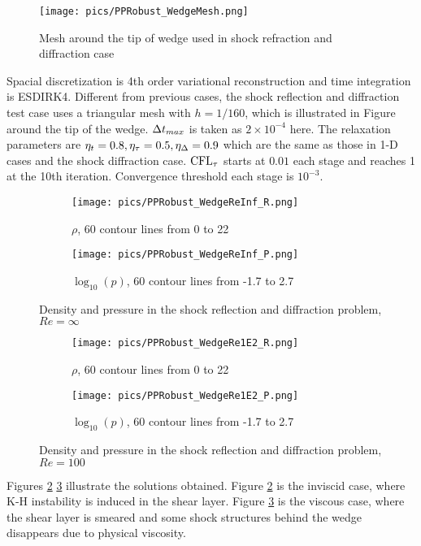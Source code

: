 \begin{figure}[htbp]
    \centering
    \texttt{[image: pics/PPRobust\_WedgeMesh.png]}
    \caption{Mesh around the tip of wedge used in shock refraction and diffraction case}
    \label{fig:wedgeMesh}
\end{figure}

Spacial discretization is 4th order variational reconstruction and 
time integration is ESDIRK4. 
Different from previous cases,
the shock reflection and diffraction test case uses a triangular mesh with $h = 1/160$,
which is illustrated in Figure around the tip of the wedge.
$\mathrm\Delta t_{max}$ is taken as $2\times10^{-4}$ here.
The relaxation parameters are $\eta_t= 0.8, \eta_\tau=0.5, \eta_\mathrm\Delta=0.9$
which are the same as those in 1-D cases and the shock diffraction case.
$\text{CFL}_\tau$ starts at $0.01$ each stage and reaches 1 at the 10th iteration.
Convergence threshold each stage is $10^{-3}$. 

\begin{figure}[htbp]
    \centering
    \begin{subfigure}{0.5\textwidth}
        \texttt{[image: pics/PPRobust\_WedgeReInf\_R.png]}
        \caption[]{$\rho$, 60 contour lines from 0 to 22}
    \end{subfigure}\hfill
    \begin{subfigure}{0.5\textwidth}
        \texttt{[image: pics/PPRobust\_WedgeReInf\_P.png]}
        \caption[]{$\log_{10}(p)$, 60 contour lines from -1.7 to 2.7}
    \end{subfigure}
    \caption{Density and pressure in the shock reflection and diffraction problem, $Re=\infty$}
    \label{fig:wedgeReInf}
\end{figure}

\begin{figure}[htbp]
    \centering
    \begin{subfigure}{0.5\textwidth}
        \texttt{[image: pics/PPRobust\_WedgeRe1E2\_R.png]}
        \caption[]{$\rho$, 60 contour lines from 0 to 22}
    \end{subfigure}\hfill
    \begin{subfigure}{0.5\textwidth}
        \texttt{[image: pics/PPRobust\_WedgeRe1E2\_P.png]}
        \caption[]{$\log_{10}(p)$, 60 contour lines from -1.7 to 2.7}
    \end{subfigure}
    \caption{Density and pressure in the shock reflection and diffraction problem, $Re=100$}
    \label{fig:wedgeRe1E2}
\end{figure}

Figures \ref{fig:wedgeReInf} \ref{fig:wedgeRe1E2} illustrate 
the solutions obtained. 
Figure \ref{fig:wedgeReInf} is the inviscid case, where 
K-H instability is induced in the shear layer. 
Figure  \ref{fig:wedgeRe1E2} is the viscous case, where 
the shear layer is smeared and some shock structures
behind the wedge disappears due to physical viscosity.